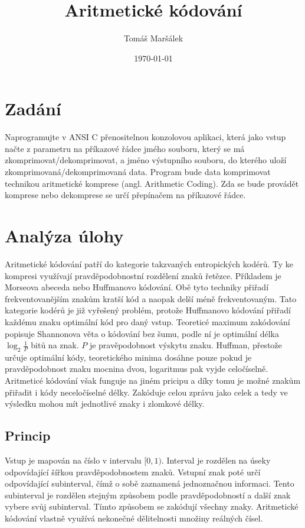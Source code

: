 \documentclass[11pt]{article}
\title{Aritmetické kódování}
\author{Tomáš Maršálek}
\date{\today}
\begin{document}
\maketitle

\section{Zadání}
Naprogramujte v ANSI C přenositelnou konzolovou aplikaci, která jako vstup
načte z parametru na příkazové řádce jmého souboru, který se má
zkomprimovat/dekomprimovat, a jméno výstupního souboru, do kterého uloží
zkomprimovaná/dekomprimovaná data. Program bude data komprimovat technikou
aritmetické komprese (angl. Arithmetic Coding). Zda se bude provádět komprese
nebo dekomprese se určí přepínačem na příkazové řádce.

\section{Analýza úlohy}
Aritmetické kódování patří do kategorie takzvaných entropických kodérů. Ty ke
kompresi využívají pravděpodobnostní rozdělení znaků řetězce. Příkladem je
Morseova abeceda nebo Huffmanovo kódování. Obě tyto techniky přiřadí
frekventovanějším znakům kratší kód a naopak delší méně frekventovaným.  Tato
kategorie kodérů je již vyřešený problém, protože Huffmanovo kódování přiřadí
každému znaku optimální kód pro daný vstup. Teoreticé maximum zakódování
popisuje Shannonova věta o kódování bez šumu, podle ní je optimální délka
$\log_2 \frac{1}{P}$ bitů na znak. $P$ je pravěpodobnost výskytu znaku.  Huffman,
přestože určuje optimální kódy, teoretického minima dosáhne pouze pokud je
pravděpodobnost znaku mocnina dvou, logaritmus pak vyjde celočíselně.
Aritmeticé kódování však funguje na jiném pricipu a díky tomu je možné znakům
přiřadit i kódy neceločíselné délky.  Zakóduje celou zprávu jako celek a tedy
ve výsledku mohou mít jednotlivé znaky i zlomkové délky.

\subsection{Princip}
Vstup je mapován na číslo v intervalu $[0, 1)$. Interval je rozdělen na úseky
odpovídající šířkou pravděpodobnostem znaků. Vstupní znak poté určí
odpovídající subinterval, čímž o sobě zaznamená jednoznačnou informaci. Tento
subinterval je rozdělen stejným způsobem podle pravděpodobností a další znak
vybere svůj subinterval. Tímto způsobem se zakódují všechny znaky. Aritmetické
kódování vlastně využívá nekonečné dělitelnosti množiny reálných čísel.
\end{document}
